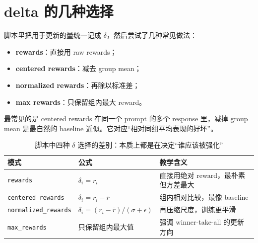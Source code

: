 \section{delta 的几种选择}

脚本里把用于更新的量统一记成 $\delta$，然后尝试了几种常见做法：

\begin{itemize}
    \item \textbf{rewards}：直接用 raw rewards；
    \item \textbf{centered rewards}：减去 group mean；
    \item \textbf{normalized rewards}：再除以标准差；
    \item \textbf{max rewards}：只保留组内最大 reward。
\end{itemize}

\begin{knowledgebox}{最常见的是 centered rewards}
在同一个 prompt 的多个 response 里，减掉 group mean 是最自然的 baseline 近似。它对应“相对同组平均表现的好坏”。
\end{knowledgebox}

\begin{table}[H]
\centering
\begin{tabular}{@{}lll@{}}
\toprule
\textbf{模式} & \textbf{公式} & \textbf{教学含义} \\
\midrule
\texttt{rewards} & $\delta_i = r_i$ & 直接用绝对 reward，最朴素但方差最大 \\
\texttt{centered\_rewards} & $\delta_i = r_i - \bar r$ & 组内相对比较，最像 baseline \\
\texttt{normalized\_rewards} & $\delta_i = (r_i - \bar r)/(\sigma + \epsilon)$ & 再压缩尺度，训练更平滑 \\
\texttt{max\_rewards} & 只保留组内最大值 & 强调 winner-take-all 的更新方向 \\
\bottomrule
\end{tabular}
\caption{脚本中四种 $\delta$ 选择的差别：本质上都是在决定“谁应该被强化”}
\end{table}


